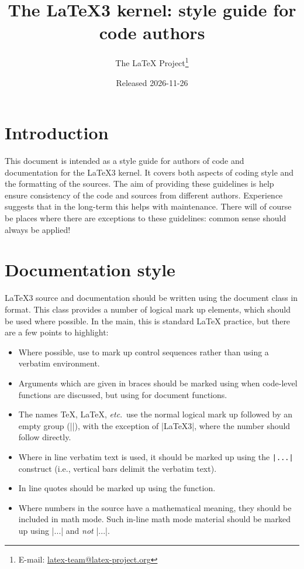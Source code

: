 \documentclass{l3doc}
\title{%
  The \LaTeX3 kernel: style guide for code authors%
}
\author{%
  The \LaTeX{} Project\thanks
    {%
      E-mail:
      \href{mailto:latex-team@latex-project.org}%
        {latex-team@latex-project.org}%
    }%
}
\date{Released 2026-11-26}
\begin{document}
\maketitle

\tableofcontents

\section{Introduction}

This document is intended as a style guide for authors of code and
documentation for the \LaTeX3 kernel. It covers both aspects of coding
style and the formatting of the sources. The aim of providing these
guidelines is help ensure consistency of the code and sources from
different authors. Experience suggests that in the long-term this helps
with maintenance. There will of course be places where there are
exceptions to these guidelines: common sense should always be
applied!

\section{Documentation style}

\LaTeX3 source and documentation should be written using the document
class  in  format. This class provides a number
of logical mark up elements, which should be used where possible.
In the main, this is standard \LaTeX{} practice, but there are a
few points to highlight:
\begin{itemize}
  \item
    Where possible, use  to mark up control sequences
    rather than using a verbatim environment.
  \item
    Arguments which are given in braces should be marked using
     when code-level functions are discussed, but using
     for document functions.
  \item
    The names \TeX{}, \LaTeX{}, \emph{etc}.\ use the normal logical mark
    up followed by an empty group (|{}|), with the exception of |\LaTeX3|,
    where the number should follow directly.
  \item
    Where in line verbatim text is used, it should be marked up
    using the \verb=|...|= construct (i.e., vertical bars delimit
    the verbatim text).
  \item In line quotes should be marked up using the 
    function.
  \item
    Where numbers in the source have a mathematical meaning,
    they should be included in math mode. Such in-line math mode
    material should be marked up using |$...$| and  \emph{not}
    |\(...\)|.
\end{itemize}
\end{document}
